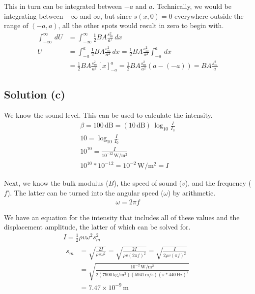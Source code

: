 \documentclass[12pt]{article}
\newcommand{\E}[1]{\times 10^{#1}}
\begin{document}
            This in turn can be integrated between $-a$ and $a$.
            Technically, we would be integrating between $-\infty$ and $\infty$, but since $s(x,0) = 0$ everywhere outside the range of $(-a,a)$, all the other spots would result in zero to begin with.
            \begin{align}
                \int_{-\infty}^{\infty}\,dU &=  \int_{-\infty}^{\infty} \frac{1}{2} BA \frac{s_m^2}{a^2}\,dx\\
                U   &=  \int_{-a}^{a} \frac{1}{2} BA \frac{s_m^2}{a^2}\,dx
                    =   \frac{1}{2} BA \frac{s_m^2}{a^2}\int_{-a}^{a}\,dx\\
                    &=  \frac{1}{2} BA \frac{s_m^2}{a^2} \left[ x \right]_{-a}^{a}
                    =   \frac{1}{2} BA \frac{s_m^2}{a^2} (a - (-a))
                    =   \boxed{BA \frac{s_m^2}{a}}
            \end{align}

        \subsection{Solution (c)}
            We know the sound level.
            This can be used to calculate the intensity.
            \begin{gather}
                \beta   =   100\,\unit{\deci\bel}
                    =   (10\,\unit{\deci\bel})\,\log_{10}\frac{I}{I_0}\\
                10  =   \log_{10}\frac{I}{I_0}\\
                10^{10} =   \frac{I}{10^{-12}\,\unit{\watt/\meter^2}}\\
                10^{10} * 10^{-12}  =   10^{-2}\,\unit{\watt/\meter^2}
                    =   I
            \end{gather}
            
            Next, we know the bulk modulus ($B$), the speed of sound ($v$), and the frequency ($f$).
            The latter can be turned into the angular speed ($\omega$) by arithmetic.
            \begin{align}
                \omega = 2\pi f
            \end{align}

            We have an equation for the intensity that includes all of these values and the displacement amplitude, the latter of which can be solved for.
            \begin{gather}
                I   =   \frac{1}{2}\rho v \omega^2 s_m^2\\
                \begin{align}
                    s_m &=  \sqrt{\frac{2I}{\rho v \omega^2}}
                        =   \sqrt{\frac{2I}{\rho v (2\pi f)^2}}
                        =   \sqrt{\frac{I}{2\rho v (\pi f)^2}}\\
                        &=  \sqrt{\frac{10^{-2}\,\unit{\watt/\meter^2}}{2(7900\,\unit{\kilo\gram/\meter^3}) (5941\,\unit{\meter/\second}) (\pi * 440\,\unit{\hertz})^2}}\\
                        &=  \boxed{7.47\E{-9}\,\unit{\meter}}
                \end{align}
            \end{gather}
\end{document}
